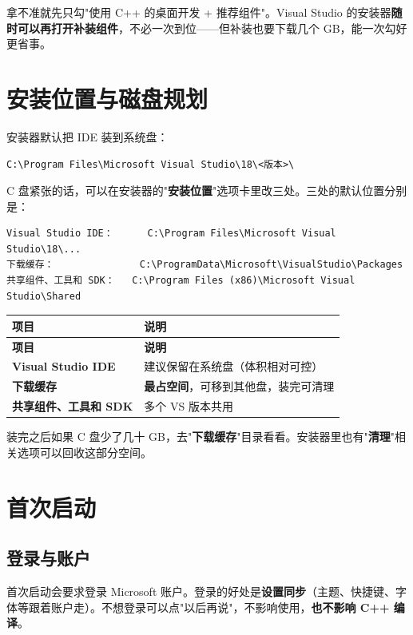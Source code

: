\begin{tipbox}[提示]
拿不准就先只勾"使用 C++ 的桌面开发 + 推荐组件"。Visual Studio 的安装器\textbf{随时可以再打开补装组件}，不必一次到位——但补装也要下载几个 GB，能一次勾好更省事。
\end{tipbox}

\section{安装位置与磁盘规划}
安装器默认把 IDE 装到系统盘：

\begin{lstlisting}[style=textstyle]
C:\Program Files\Microsoft Visual Studio\18\<版本>\
\end{lstlisting}

C 盘紧张的话，可以在安装器的"\textbf{安装位置}"选项卡里改三处。三处的默认位置分别是：

\begin{lstlisting}[style=textstyle]
Visual Studio IDE：      C:\Program Files\Microsoft Visual Studio\18\...
下载缓存：               C:\ProgramData\Microsoft\VisualStudio\Packages
共享组件、工具和 SDK：   C:\Program Files (x86)\Microsoft Visual Studio\Shared
\end{lstlisting}

\begin{longtable}{L{4.2cm}L{10.4cm}}
\toprule
\textbf{项目} & \textbf{说明} \\
\midrule
\endfirsthead
\toprule
\textbf{项目} & \textbf{说明} \\
\midrule
\endhead
\bottomrule
\endlastfoot
\textbf{Visual Studio IDE} & 建议保留在系统盘（体积相对可控） \\
\textbf{下载缓存} & \textbf{最占空间}，可移到其他盘，装完可清理 \\
\textbf{共享组件、工具和 SDK} & 多个 VS 版本共用 \\
\end{longtable}

\begin{keybox}[实战场景]
装完之后如果 C 盘少了几十 GB，去"\textbf{下载缓存}"目录看看。安装器里也有"\textbf{清理}"相关选项可以回收这部分空间。
\end{keybox}

\section{首次启动}
\subsection{登录与账户}
首次启动会要求登录 Microsoft 账户。登录的好处是\textbf{设置同步}（主题、快捷键、字体等跟着账户走）。不想登录可以点"以后再说"，不影响使用，\textbf{也不影响 C++ 编译}。

